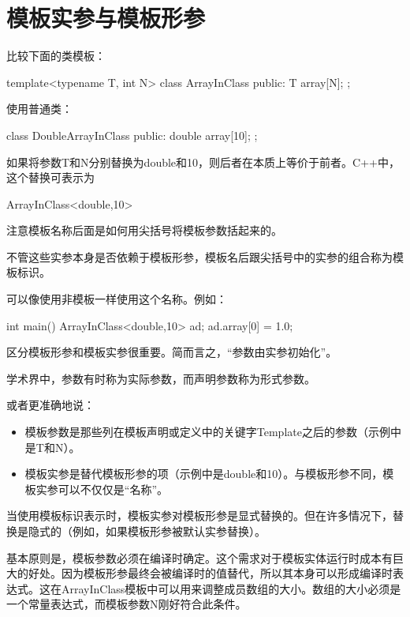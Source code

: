 \section{模板实参与模板形参}

比较下面的类模板：

\begin{cpp}
template<typename T, int N>
class ArrayInClass {
	public:
	T array[N];
};
\end{cpp}

使用普通类：

\begin{cpp}
class DoubleArrayInClass {
	public:
	double array[10];
};
\end{cpp}

如果将参数T和N分别替换为double和10，则后者在本质上等价于前者。C++中，这个替换可表示为

\begin{cpp}
ArrayInClass<double,10>
\end{cpp}

注意模板名称后面是如何用尖括号将模板参数括起来的。

不管这些实参本身是否依赖于模板形参，模板名后跟尖括号中的实参的组合称为模板标识。

可以像使用非模板一样使用这个名称。例如：

\begin{cpp}
int main() {
	ArrayInClass<double,10> ad;
	ad.array[0] = 1.0;
}
\end{cpp}

区分模板形参和模板实参很重要。简而言之，“参数由实参初始化”。

\begin{notice}
学术界中，参数有时称为实际参数，而声明参数称为形式参数。
\end{notice}

或者更准确地说：

\begin{itemize}
\item 
模板参数是那些列在模板声明或定义中的关键字Template之后的参数（示例中是T和N）。

\item 
模板实参是替代模板形参的项（示例中是double和10）。与模板形参不同，模板实参可以不仅仅是“名称”。
\end{itemize}

当使用模板标识表示时，模板实参对模板形参是显式替换的。但在许多情况下，替换是隐式的（例如，如果模板形参被默认实参替换）。

基本原则是，模板参数必须在编译时确定。这个需求对于模板实体运行时成本有巨大的好处。因为模板形参最终会被编译时的值替代，所以其本身可以形成编译时表达式。这在ArrayInClass模板中可以用来调整成员数组的大小。数组的大小必须是一个常量表达式，而模板参数N刚好符合此条件。

